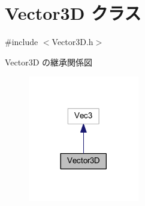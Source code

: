 \hypertarget{class_vector3_d}{}\section{Vector3D クラス}
\label{class_vector3_d}


{\ttfamily \#include $<$Vector3\+D.\+h$>$}



Vector3D の継承関係図\nopagebreak
\begin{figure}[H]
\begin{center}
\leavevmode
\includegraphics[width=137pt]{class_vector3_d__inherit__graph}
\end{center}
\end{figure}
